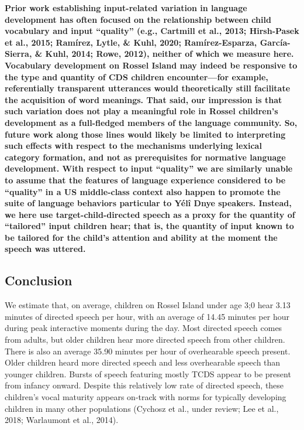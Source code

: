 \documentclass[,man,floatsintext]{apa6}
\begin{document}
\textbf{Prior work establishing input-related variation in language
development has often focused on the relationship between child
vocabulary and input \enquote{quality} (e.g., Cartmill et al., 2013;
Hirsh-Pasek et al., 2015; Ramírez, Lytle, \& Kuhl, 2020;
Ramírez-Esparza, García-Sierra, \& Kuhl, 2014; Rowe, 2012), neither of
which we measure here. Vocabulary development on Rossel Island may
indeed be responsive to the type and quantity of CDS children
encounter---for example, referentially transparent utterances would
theoretically still facilitate the acquisition of word meanings. That
said, our impression is that such variation does not play a meaningful
role in Rossel children's development as a full-fledged members of the
language community. So, future work along those lines would likely be
limited to interpreting such effects with respect to the mechanisms
underlying lexical category formation, and not as prerequisites for
normative language development. With respect to input \enquote{quality}
we are similarly unable to assume that the features of language
experience considered to be \enquote{quality} in a US middle-class
context also happen to promote the suite of language behaviors
particular to Yélî Dnye speakers. Instead, we here use
target-child-directed speech as a proxy for the quantity of
\enquote{tailored} input children hear; that is, the quantity of input
known to be tailored for the child's attention and ability at the moment
the speech was uttered.}

\subsection{Conclusion}\label{disc-conclusion}

We estimate that, on average, children on Rossel Island under age 3;0
hear 3.13 minutes of directed speech per hour, with an average of 14.45
minutes per hour during peak interactive moments during the day. Most
directed speech comes from adults, but older children hear more directed
speech from other children. There is also an average 35.90 minutes per
hour of overhearable speech present. Older children heard more directed
speech and less overhearable speech than younger children. Bursts of
speech featuring mostly TCDS appear to be present from infancy onward.
Despite this relatively low rate of directed speech, these children's
vocal maturity appears on-track with norms for typically developing
children in many other populations (Cychosz et al., under review; Lee et
al., 2018; Warlaumont et al., 2014).
\end{document}
